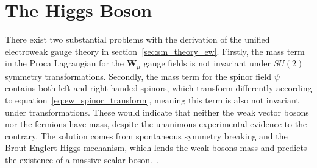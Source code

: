 \section{The Higgs Boson} \label{sec:sm_theory_higgs}
There exist two substantial problems with the derivation of the unified electroweak gauge theory in section~\ref{sec:sm_theory_ew}. Firstly, the mass term in the Proca Lagrangian for the $\mathbf{W}_\mu$ gauge fields is not invariant under $SU(2)$ symmetry transformations. Secondly, the mass term for the spinor field $\psi$ contains both left and right-handed spinors, which transform differently according to equation~\ref{eq:ew_spinor_transform}, meaning this term is also not invariant under transformations. These would indicate that neither the weak vector bosons nor the fermions have mass, despite the unanimous experimental evidence to the contrary. The solution comes from spontaneous symmetry breaking and the Brout-Englert-Higgs mechanism, which lends the weak bosons mass and predicts the existence of a massive scalar boson.~\cite{higgs,ssb}.

